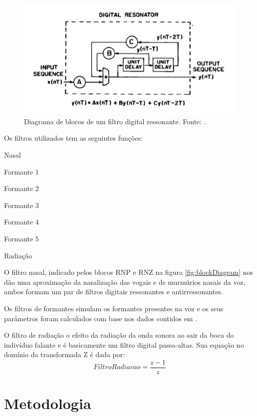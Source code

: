\documentclass[
  12pt,       
  openright,      
  twoside,      
  a4paper,      
  english,      
  french,       
  spanish,      
  brazil,     
  ]{abntex2}
\begin{document}
\begin{figure}
\includegraphics[width=\textwidth,keepaspectratio]{imagens/diagrama_bloco_filtro_digital.PNG}
\caption{Diagrama de blocos de um filtro digital ressonante. Fonte: .}
\label{fig:diagramaBlocoFiltroDigital}
\end{figure}

Os filtros utilizados tem as seguintes funções:
\begin{alineas}
\item Nasal
\item Formante 1
\item Formante 2
\item Formante 3
\item Formante 4
\item Formante 5
\item Radiação
\end{alineas}

O filtro nasal, indicado pelos blocos RNP e RNZ na figura \ref{fig:blockDiagram} nos dão uma aproximação da nasalização das vogais e de murmúrios nasais da voz, ambos formam um par de filtros digitais ressonantes e antirressonantes.

Os filtros de formantes simulam os formantes presentes na voz e os seus parâmetros foram calculados com base nos dados contidos em .

O filtro de radiação o efeito da radiação da onda sonora ao sair da boca do indivíduo falante e é basicamente um filtro digital passa-altas. Sua equação no domínio da transformada Z é dada por:
\begin{equation}
\label{eq:filtroRadiacao}
FiltroRadiacao = \frac{z - 1}{z}
\end{equation}

\chapter{Metodologia}
\end{document}
